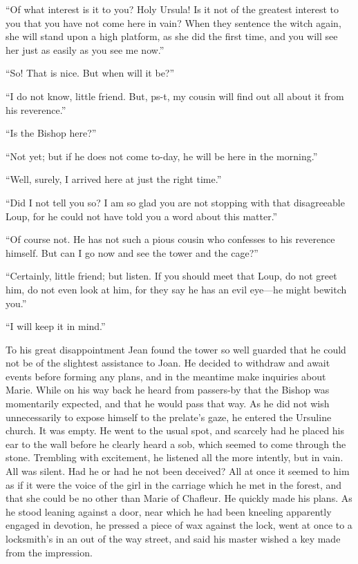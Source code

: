 ``Of what interest is it to you? Holy Ursula! Is it not of the greatest
interest to you that you have not come here in vain? When they sentence
the witch again, she will stand upon a high platform, as she did the
first time, and you will see her just as easily as you see me now.''

``So! That is nice. But when will it be?''

``I do not know, little friend. But, ps-t, my cousin will find out all
about it from his reverence.''

``Is the Bishop here?''

``Not yet; but if he does not come to-day, he will be here in the
morning.''

``Well, surely, I arrived here at just the right time.''

``Did I not tell you so? I am so glad you are not stopping with that
disagreeable Loup, for he could not have told you a word about this
matter.''

``Of course not. He has not such a pious cousin who confesses to his
reverence himself. But can I go now and see the tower and the cage?''

``Certainly, little friend; but listen. If you should meet that Loup, do
not greet him, do not even look at him, for they say he has an evil
eye---he might bewitch you.''

``I will keep it in mind.''

To his great disappointment Jean found the tower so well guarded that he
could not be of the slightest assistance to Joan. He decided to withdraw
and await events before forming any plans, and in the meantime make
inquiries about Marie. While on his way back he heard from passers-by
that the Bishop was momentarily expected, and that he would pass that
way. As he did not wish unnecessarily to expose himself to the prelate's
gaze, he entered the Ursuline church. It was empty. He went to the usual
spot, and scarcely had he placed his ear to the wall before he clearly
heard a sob, which seemed to come through the stone. Trembling with
excitement, he listened all the more intently, but in vain. All was
silent. Had he or had he not been deceived? All at once it seemed to him
as if it were the voice of the girl in the carriage which he met in the
forest, and that she could be no other than Marie of Chafleur. He
quickly made his plans. As he stood leaning against a door, near which
he had been kneeling apparently engaged in devotion, he pressed a piece
of wax against the lock, went at once to a locksmith's in an out of the
way street, and said his master wished a key made from the impression.

